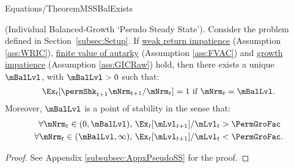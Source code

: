 \documentclass[BufferStockTheory]{subfiles}
\begin{document}
\begin{verbatimwrite}{Equations/TheoremMSSBalExists}
  \begin{theorem}(Individual Balanced-Growth `Pseudo Steady State').
    Consider the problem defined in Section~\ref{subsec:Setup}.
If \hyperlink{WRIC}{weak return impatience} (Assumption \ref{ass:WRIC}), \hyperlink{FVAC}{finite value of autarky} (Assumption \ref{ass:FVAC}) and \hyperlink{GIC}{growth impatience} (Assumption \ref{ass:GICRaw}) hold, then there exists a unique $\mBalLvl$, with $\mBalLvl>0$ such that:
    \begin{equation}
      \Ex_t [\permShk_{t+1}{\mNrm}_{t+1}/\mNrm_t] = 1 \mbox{~if~} \mNrm_t = \mBalLvl.
      \label{eq:mBalLvl}
    \end{equation}
    Moreover, $\mBalLvl$ is a point of stability in the sense that:
    \begin{equation}
      \label{eq:stabilityStE}
      \begin{split}
        \forall {\mNrm}_t\in(0,\mBalLvl),      \,\,& \Ex_{t}[\mLvl_{t+1}]/\mLvl_{t} > \PermGroFac \\
        \forall {\mNrm}_t\in(\mBalLvl,\infty), \,\,& \Ex_{t}[\mLvl_{t+1}]/\mLvl_{t} < \PermGroFac.
      \end{split}
    \end{equation}
  \end{theorem}
\end{verbatimwrite}

\begin{proof}
See Appendix \ref{subsubsec:AppxPseudoSS} for the proof.

\end{proof}
\end{document}
